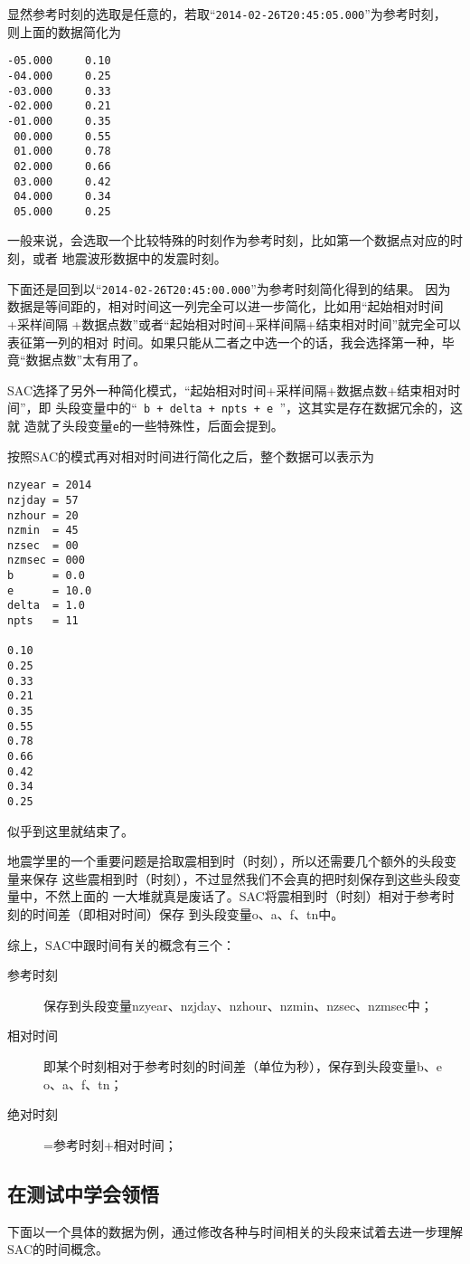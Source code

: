 显然参考时刻的选取是任意的，若取``\lstinline{2014-02-26T20:45:05.000}''为参考时刻，
则上面的数据简化为
\begin{lstlisting}[style=Bash]
-05.000     0.10
-04.000     0.25
-03.000     0.33
-02.000     0.21
-01.000     0.35
 00.000     0.55
 01.000     0.78
 02.000     0.66
 03.000     0.42
 04.000     0.34
 05.000     0.25
\end{lstlisting}

一般来说，会选取一个比较特殊的时刻作为参考时刻，比如第一个数据点对应的时刻，或者
地震波形数据中的发震时刻。

下面还是回到以``\lstinline{2014-02-26T20:45:00.000}''为参考时刻简化得到的结果。
因为数据是等间距的，相对时间这一列完全可以进一步简化，比如用``起始相对时间+采样间隔
+数据点数''或者``起始相对时间+采样间隔+结束相对时间''就完全可以表征第一列的相对
时间。如果只能从二者之中选一个的话，我会选择第一种，毕竟``数据点数''太有用了。

SAC选择了另外一种简化模式，``起始相对时间+采样间隔+数据点数+结束相对时间''，即
头段变量中的``\lstinline{ b + delta + npts + e }''，这其实是存在数据冗余的，这就
造就了头段变量\lstinline{e}的一些特殊性，后面会提到。

按照SAC的模式再对相对时间进行简化之后，整个数据可以表示为
\begin{lstlisting}[style=Bash]
nzyear = 2014 
nzjday = 57
nzhour = 20
nzmin  = 45
nzsec  = 00
nzmsec = 000
b      = 0.0
e      = 10.0
delta  = 1.0
npts   = 11

0.10
0.25
0.33
0.21
0.35
0.55
0.78
0.66
0.42
0.34
0.25
\end{lstlisting}

似乎到这里就结束了。

地震学里的一个重要问题是拾取震相到时（时刻），所以还需要几个额外的头段变量来保存
这些震相到时（时刻），不过显然我们不会真的把时刻保存到这些头段变量中，不然上面的
一大堆就真是废话了。SAC将震相到时（时刻）相对于参考时刻的时间差（即相对时间）保存
到头段变量o、a、f、tn中。

综上，SAC中跟时间有关的概念有三个：
\begin{description}
    \item [参考时刻] 保存到头段变量nzyear、nzjday、nzhour、nzmin、nzsec、nzmsec中；
    \item [相对时间] 即某个时刻相对于参考时刻的时间差（单位为秒），保存到头段变量b、e
    o、a、f、tn；
    \item [绝对时刻] =参考时刻+相对时间；
\end{description}

\subsection{在测试中学会领悟}
下面以一个具体的数据为例，通过修改各种与时间相关的头段来试着去进一步理解SAC的时间概念。

